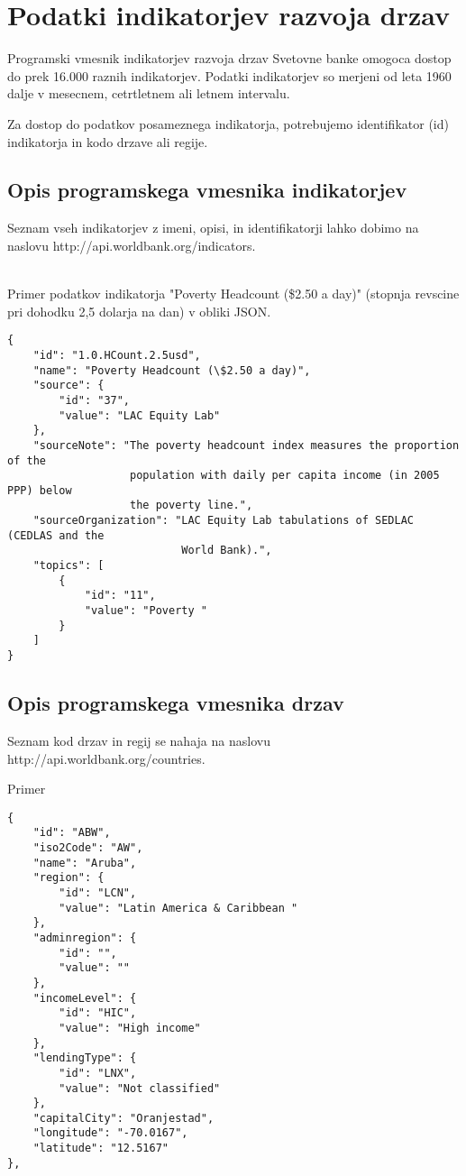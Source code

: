 \section{Podatki indikatorjev razvoja drzav}

Programski vmesnik indikatorjev razvoja drzav Svetovne banke omogoca dostop
do prek 16.000 raznih indikatorjev. Podatki indikatorjev so merjeni od leta
1960 dalje v mesecnem, cetrtletnem ali letnem intervalu. 


Za dostop do podatkov posameznega indikatorja, potrebujemo identifikator (id)
indikatorja in kodo drzave ali regije. 


\subsection{Opis programskega vmesnika indikatorjev}
Seznam vseh indikatorjev z imeni, opisi, in identifikatorji lahko dobimo na 
naslovu http://api.worldbank.org/indicators.

\ \\
Primer podatkov indikatorja "Poverty Headcount (\$2.50 a day)" (stopnja revscine
pri dohodku 2,5 dolarja na dan) v obliki JSON.

\begin{lstlisting}
{
    "id": "1.0.HCount.2.5usd",
    "name": "Poverty Headcount (\$2.50 a day)",
    "source": {
        "id": "37",
        "value": "LAC Equity Lab"
    },
    "sourceNote": "The poverty headcount index measures the proportion of the 
                   population with daily per capita income (in 2005 PPP) below
                   the poverty line.",
    "sourceOrganization": "LAC Equity Lab tabulations of SEDLAC (CEDLAS and the
                           World Bank).",
    "topics": [
        {
            "id": "11",
            "value": "Poverty "
        }
    ]
}
\end{lstlisting}


\subsection{Opis programskega vmesnika drzav}
Seznam kod drzav in regij se nahaja na naslovu 
http://api.worldbank.org/countries.

Primer

\begin{lstlisting}
{
    "id": "ABW",
    "iso2Code": "AW",
    "name": "Aruba",
    "region": {
        "id": "LCN",
        "value": "Latin America & Caribbean "
    },
    "adminregion": {
        "id": "",
        "value": ""
    },
    "incomeLevel": {
        "id": "HIC",
        "value": "High income"
    },
    "lendingType": {
        "id": "LNX",
        "value": "Not classified"
    },
    "capitalCity": "Oranjestad",
    "longitude": "-70.0167",
    "latitude": "12.5167"
},
\end{lstlisting}

